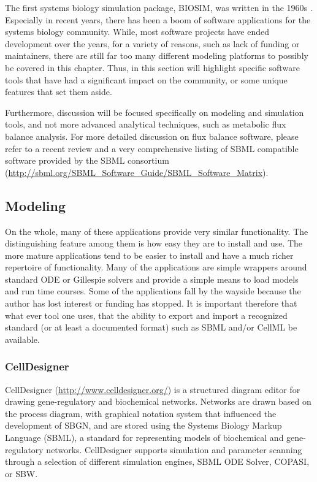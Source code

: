 The first systems biology simulation package, BIOSIM, was written in the
1960s \autocite{Ga68}. Especially in recent years, there has been a boom
of software applications for the systems biology community. While, most
software projects have ended development over the years, for a variety
of reasons, such as lack of funding or maintainers, there are still far
too many different modeling platforms to possibly be covered in this
chapter. Thus, in this section will highlight specific software tools
that have had a significant impact on the community, or some unique
features that set them aside.

Furthermore, discussion will be focused specifically on modeling and
simulation tools, and not more advanced analytical techniques, such as
metabolic flux balance analysis. For more detailed discussion on flux
balance software, please refer to a recent review
\autocite{copeland2012computational} and a very comprehensive listing of
SBML compatible software provided by the SBML consortium
(\url{http://sbml.org/SBML_Software_Guide/SBML_Software_Matrix}).

\subsection{Modeling}

On the whole, many of these applications provide very similar
functionality. The distinguishing feature among them is how easy they
are to install and use. The more mature applications tend to be easier
to install and have a much richer repertoire of functionality. Many of
the applications are simple wrappers around standard ODE or Gillespie
solvers and provide a simple means to load models and run time courses.
Some of the applications fall by the wayside because the author has lost
interest or funding has stopped. It is important therefore that what
ever tool one uses, that the ability to export and import a recognized
standard (or at least a documented format) such as SBML and/or CellML be
available.

\subsubsection{CellDesigner}

CellDesigner (\url{http://www.celldesigner.org/})
\autocite{funahashi2003celldesigner}
\autocite{funahashi2008celldesigner} is a structured diagram editor for
drawing gene-regulatory and biochemical networks. Networks are drawn
based on the process diagram, with graphical notation system that
influenced the development of SBGN, and are stored using the Systems
Biology Markup Language (SBML), a standard for representing models of
biochemical and gene-regulatory networks. CellDesigner supports
simulation and parameter scanning through a selection of different
simulation engines, SBML ODE Solver, COPASI, or SBW.

